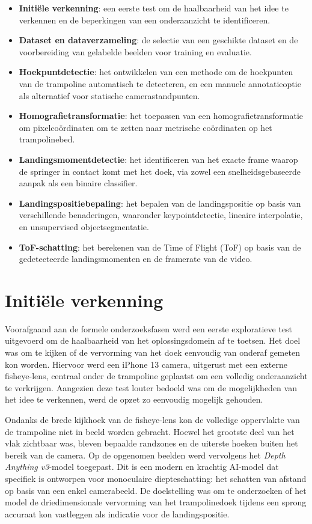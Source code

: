 \begin{itemize}
    \item \textbf{Initi{\"e}le verkenning}: een eerste test om de haalbaarheid van het idee te verkennen en de beperkingen van een onderaanzicht te identificeren.
    \item \textbf{Dataset en dataverzameling}: de selectie van een geschikte dataset en de voorbereiding van gelabelde beelden voor training en evaluatie.
    \item \textbf{Hoekpuntdetectie}: het ontwikkelen van een methode om de hoekpunten van de trampoline automatisch te detecteren, en een manuele annotatieoptie als alternatief voor statische camerastandpunten.
    \item \textbf{Homografietransformatie}: het toepassen van een homografietransformatie om pixelco{\"o}rdinaten om te zetten naar metrische co{\"o}rdinaten op het trampolinebed.
    \item \textbf{Landingsmomentdetectie}: het identificeren van het exacte frame waarop de springer in contact komt met het doek, via zowel een snelheidsgebaseerde aanpak als een binaire classifier.
    \item \textbf{Landingspositiebepaling}: het bepalen van de landingspositie op basis van verschillende benaderingen, waaronder keypointdetectie, lineaire interpolatie, en unsupervised objectsegmentatie.
    \item \textbf{ToF-schatting}: het berekenen van de Time of Flight (ToF) op basis van de gedetecteerde landingsmomenten en de framerate van de video.
\end{itemize}

\section{Initi{\"e}le verkenning}
\label{sec:methodologie-verkenning}

Voorafgaand aan de formele onderzoeksfasen werd een eerste exploratieve test uitgevoerd om de haalbaarheid van het oplossingsdomein af te toetsen. Het doel was om te kijken of de vervorming van het doek eenvoudig van onderaf gemeten kon worden. Hiervoor werd een iPhone 13 camera, uitgerust met een externe fisheye-lens, centraal onder de trampoline geplaatst om een volledig onderaanzicht te verkrijgen. Aangezien deze test louter bedoeld was om de mogelijkheden van het idee te verkennen, werd de opzet zo eenvoudig mogelijk gehouden.

Ondanks de brede kijkhoek van de fisheye-lens kon de volledige oppervlakte van de trampoline niet in beeld worden gebracht. Hoewel het grootste deel van het vlak zichtbaar was, bleven bepaalde randzones en de uiterste hoeken buiten het bereik van de camera. Op de opgenomen beelden werd vervolgens het \textit{Depth Anything v3}-model toegepast. Dit is een modern en krachtig AI-model dat specifiek is ontworpen voor monoculaire diepteschatting: het schatten van afstand op basis van een enkel camerabeeld. De doelstelling was om te onderzoeken of het model de driedimensionale vervorming van het trampolinedoek tijdens een sprong accuraat kon vastleggen als indicatie voor de landingspositie.

